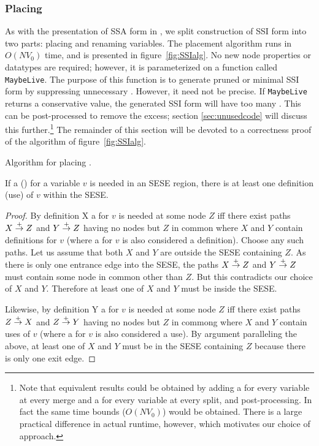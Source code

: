 \documentclass[12pt,titlepage]{article}
\begin{document}
\subsubsection{Placing }
As with the presentation of SSA form in \cite{cytron91:ssa}, we split
construction of SSI form into two parts: placing 
and renaming variables.  The placement algorithm runs in $O(N V_0)$
time, and is presented in figure~\vref{fig:SSIalg}.  No new node
properties or datatypes are required; however, it is parameterized on
a function called \texttt{MaybeLive}.  The purpose of this function is
to generate pruned or minimal SSI form by suppressing unnecessary
.  However, it need not be precise.  If
\texttt{MaybeLive} returns a conservative value, the generated SSI
form will have too many .  This can be
post-processed to remove the excess; section \ref{sec:unusedcode} will
discuss this further.\footnote{Note that equivalent results could be
obtained by adding a \phifunction{} for every variable at every merge
and a \sigfunction{} for every variable at every split, and
post-processing.  In fact the same time bounds ($O(N V_0)$) would be
obtained.  There is a large practical difference in actual runtime,
however, which motivates our choice of approach.}  The remainder of
this section will be devoted to a correctness proof of the algorithm
of figure~\ref{fig:SSIalg}.

\begin{myfigure}\small%

\caption{Algorithm for placing .}\label{fig:SSIalg}
\end{myfigure}

\begin{lemma}
If a \phifunction{} (\sigfunction{}) for a variable $v$ is needed in
an SESE region, there is at least one definition (use) of $v$ within
the SESE.
\end{lemma}
\begin{proof}
By definition X a \phifunction{} for $v$ is needed at some node $Z$
iff there exist paths $X \stackrel{+}{\rightarrow} Z$ and $Y \stackrel{+}{\rightarrow} Z$ having no
nodes but $Z$ in common where $X$ and $Y$ contain definitions for $v$
(where a \phisigfunction[or] for $v$ is also considered a definition).
Choose any such paths.  Let us assume that both $X$ and $Y$ are
outside the SESE containing $Z$.  As there is only one entrance edge
into the SESE, the paths $X \stackrel{+}{\rightarrow} Z$ and $Y \stackrel{+}{\rightarrow} Z$ must
contain some node in common other than $Z$.  But this contradicts our
choice of $X$ and $Y$.  Therefore at least one of $X$ and $Y$ must be
inside the SESE.

Likewise, by definition Y a \sigfunction{} for $v$ is needed at some
node $Z$ iff there exist paths $Z \stackrel{+}{\rightarrow} X$ and $Z \stackrel{+}{\rightarrow} Y$
having no nodes but $Z$ in commong where $X$ and $Y$ contain uses of
$v$ (where a \phisigfunction[or] for $v$ is also considered a use).
By argument paralleling the above, at least one of $X$ and $Y$ must be
in the SESE containing $Z$ because there is only one exit edge.
\end{proof}
\end{document}
